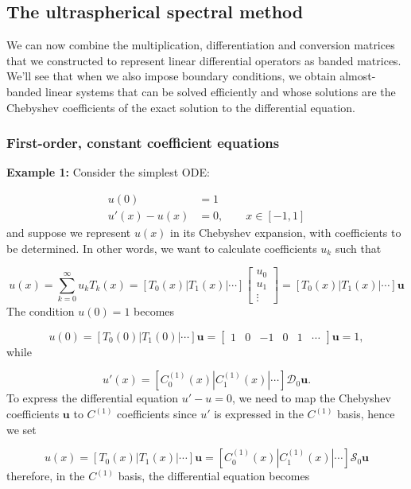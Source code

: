 \documentclass[12pt,landscape]{article}
\begin{document}
{\subsection{The ultraspherical spectral method}
We can now combine the multiplication, differentiation and conversion matrices that we constructed to represent linear differential operators as banded matrices. We'll see that when we also impose boundary conditions, we obtain almost-banded linear systems that can be solved efficiently and whose solutions are the Chebyshev coefficients of the exact solution to the differential equation.

\subsubsection{First-order, constant coefficient equations}
\textbf{Example 1:} Consider the simplest ODE:


\begin{align*}
u(0) &= 1 \\
u'(x) - u(x) &= 0, \qquad x \in [-1, 1]
\end{align*}
and suppose we represent $u(x)$ in its Chebyshev expansion, with coefficients to be determined. In other words, we want to calculate coefficients $u_k$ such that

\[
u(x) = \sum_{k=0}^\infty u_k T_k(x) = \left[ T_0(x) | T_1(x) | \cdots \right] \begin{bmatrix} u_0 \\ u_1 \\ \vdots \end{bmatrix}=  \left[ T_0(x) | T_1(x) | \cdots \right] \mathbf{u}
\]
The condition $u(0) = 1$ becomes

\[
u(0) = \left[ T_0(0) | T_1(0) | \cdots \right] \mathbf{u} = \begin{bmatrix}
1 & 0 & -1 & 0 & 1 & \cdots
\end{bmatrix}\mathbf{u} = 1,
\]
while

\[
u'(x) = \left[ C_0^{(1)}(x) | C_1^{(1)}(x) | \cdots \right]\mathcal{D}_0 \mathbf{u}.
\]
To express the differential equation $u' - u = 0$, we need to map the Chebyshev coefficients $\mathbf{u}$ to $C^{(1)}$ coefficients since $u'$ is expressed in the $C^{(1)}$ basis, hence we set

\[
u(x) = \left[ T_0(x) | T_1(x) | \cdots \right] \mathbf{u} =  \left[ C_0^{(1)}(x) | C_1^{(1)}(x) | \cdots \right]\mathcal{S}_0 \mathbf{u} 
\]
therefore, in the $C^{(1)}$  basis, the differential equation becomes


}
\end{document}
